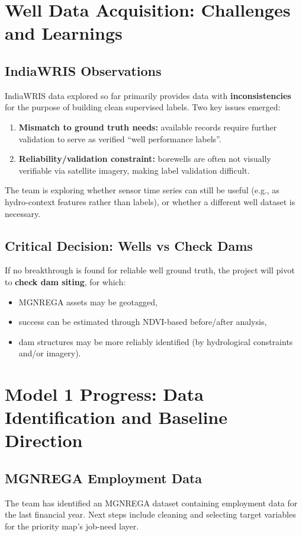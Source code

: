 \documentclass[12pt,a4paper]{report}
\begin{document}
\section{Well Data Acquisition: Challenges and Learnings}
\subsection{IndiaWRIS Observations}
IndiaWRIS data explored so far primarily provides data with \textbf{inconsistencies} for the purpose of building clean supervised labels. Two key issues emerged:
\begin{enumerate}
  \item \textbf{Mismatch to ground truth needs:} available records require further validation to serve as verified “well performance labels”.
  \item \textbf{Reliability/validation constraint:} borewells are often not visually verifiable via satellite imagery, making label validation difficult.
\end{enumerate}
The team is exploring whether sensor time series can still be useful (e.g., as hydro-context features rather than labels), or whether a different well dataset is necessary.

\subsection{Critical Decision: Wells vs Check Dams}
If no breakthrough is found for reliable well ground truth, the project will pivot to \textbf{check dam siting}, for which:
\begin{itemize}
  \item MGNREGA assets may be geotagged,
  \item success can be estimated through NDVI-based before/after analysis,
  \item dam structures may be more reliably identified (by hydrological constraints and/or imagery).
\end{itemize}

\section{Model 1 Progress: Data Identification and Baseline Direction}
\subsection{MGNREGA Employment Data}
The team has identified an MGNREGA dataset containing employment data for the last financial year. Next steps include cleaning and selecting target variables for the priority map’s job-need layer.
\end{document}
